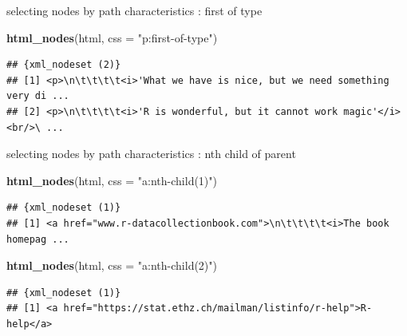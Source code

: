 \documentclass[ignorenonframetext,]{beamer}
\newenvironment{Shaded}{\begin{snugshade}}{\end{snugshade}}
\newcommand{\KeywordTok}[1]{\textcolor[rgb]{0.13,0.29,0.53}{\textbf{{#1}}}}
\newcommand{\DataTypeTok}[1]{\textcolor[rgb]{0.13,0.29,0.53}{{#1}}}
\newcommand{\StringTok}[1]{\textcolor[rgb]{0.31,0.60,0.02}{{#1}}}
\newcommand{\NormalTok}[1]{{#1}}
\begin{document}
\begin{frame}[fragile]{selecting nodes by path characteristics : first
of type}

\begin{Shaded}
\begin{Highlighting}[]
\KeywordTok{html_nodes}\NormalTok{(html, }\DataTypeTok{css =} \StringTok{"p:first-of-type"}\NormalTok{)}
\end{Highlighting}
\end{Shaded}

\begin{verbatim}
## {xml_nodeset (2)}
## [1] <p>\n\t\t\t\t<i>'What we have is nice, but we need something very di ...
## [2] <p>\n\t\t\t\t<i>'R is wonderful, but it cannot work magic'</i><br/>\ ...
\end{verbatim}

\end{frame}

\begin{frame}[fragile]{selecting nodes by path characteristics : nth
child of parent}

\begin{Shaded}
\begin{Highlighting}[]
\KeywordTok{html_nodes}\NormalTok{(html, }\DataTypeTok{css =} \StringTok{"a:nth-child(1)"}\NormalTok{)}
\end{Highlighting}
\end{Shaded}

\begin{verbatim}
## {xml_nodeset (1)}
## [1] <a href="www.r-datacollectionbook.com">\n\t\t\t\t<i>The book homepag ...
\end{verbatim}

\begin{Shaded}
\begin{Highlighting}[]
\KeywordTok{html_nodes}\NormalTok{(html, }\DataTypeTok{css =} \StringTok{"a:nth-child(2)"}\NormalTok{)}
\end{Highlighting}
\end{Shaded}

\begin{verbatim}
## {xml_nodeset (1)}
## [1] <a href="https://stat.ethz.ch/mailman/listinfo/r-help">R-help</a>
\end{verbatim}

\end{frame}
\end{document}

